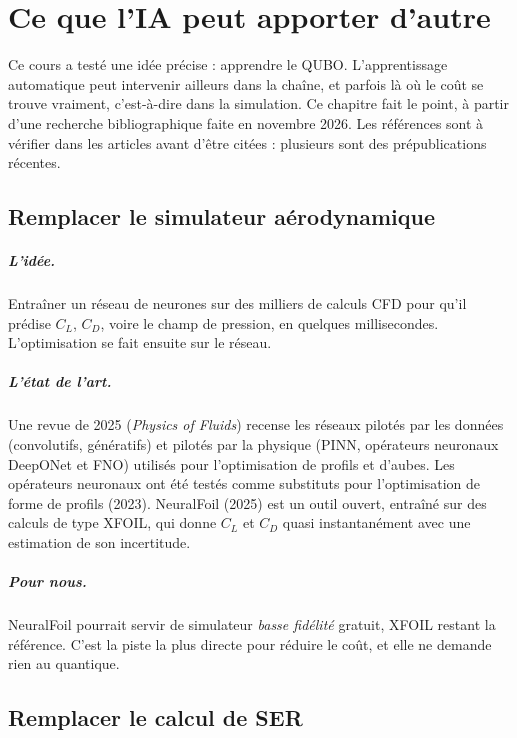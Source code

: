 \chapter{Ce que l'IA peut apporter d'autre}\label{ch:ia-autres}

Ce cours a testé une idée précise : apprendre le QUBO. L'apprentissage automatique peut intervenir ailleurs dans la chaîne, et parfois là où le coût se trouve vraiment, c'est-à-dire dans la simulation. Ce chapitre fait le point, à partir d'une recherche bibliographique faite en novembre 2026. Les références sont à vérifier dans les articles avant d'être citées : plusieurs sont des prépublications récentes.

\section{Remplacer le simulateur aérodynamique}
\paragraph{L'idée.} Entraîner un réseau de neurones sur des milliers de calculs CFD pour qu'il prédise $C_L$, $C_D$, voire le champ de pression, en quelques millisecondes. L'optimisation se fait ensuite sur le réseau.
\paragraph{L'état de l'art.} Une revue de 2025 (\emph{Physics of Fluids}) recense les réseaux \og pilotés par les données\fg{} (convolutifs, génératifs) et \og pilotés par la physique\fg{} (PINN, opérateurs neuronaux DeepONet et FNO) utilisés pour l'optimisation de profils et d'aubes. Les opérateurs neuronaux ont été testés comme substituts pour l'optimisation de forme de profils (2023). NeuralFoil (2025) est un outil ouvert, entraîné sur des calculs de type XFOIL, qui donne $C_L$ et $C_D$ quasi instantanément avec une estimation de son incertitude.
\paragraph{Pour nous.} NeuralFoil pourrait servir de simulateur \emph{basse fidélité} gratuit, XFOIL restant la référence. C'est la piste la plus directe pour réduire le coût, et elle ne demande rien au quantique.

\section{Remplacer le calcul de SER}
